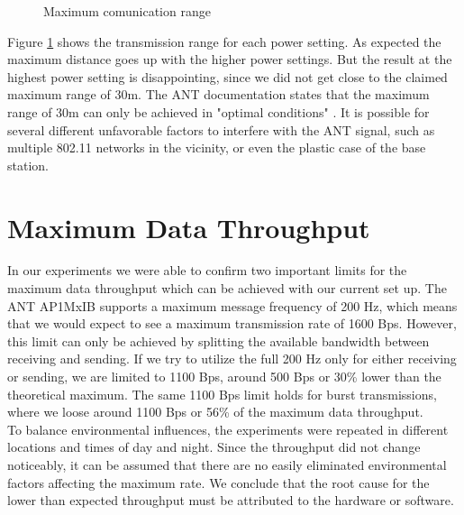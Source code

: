 \begin{description}
\begin{figure}[H]
		\caption{Maximum comunication range}\label{fig:exp6}
	\end{figure}
	Figure \ref{fig:exp6} shows the transmission range for each power setting. As expected the maximum distance goes up with the higher power settings. But the result at the highest power setting is disappointing, since we did not get close to the claimed maximum range of 30m. The ANT documentation states that the maximum range of 30m can only be achieved in "optimal conditions" \cite{DynastreamInnovationsInc.2013}. It is possible for several different unfavorable factors to interfere with the ANT signal, such as multiple 802.11 networks in the vicinity, or even the plastic case of the base station. 
\end{description}


\section{Maximum Data Throughput}
\label{sec:dataThrougput}

In our experiments we were able to confirm two important limits for the maximum data throughput which can be achieved with our current set up. The ANT AP1MxIB supports a maximum message frequency of 200 Hz, which means that we would expect to see a maximum transmission rate of 1600 Bps.
However, this limit can only be achieved by splitting the available bandwidth between receiving and sending. If we try to utilize the full 200 Hz only for either receiving or sending, we are limited to 1100 Bps, around 500 Bps or 30\% lower than the theoretical maximum. The same 1100 Bps limit holds for burst transmissions, where we loose around 1100 Bps or 56\% of the maximum data throughput.\\

To balance environmental influences, the experiments were repeated in different locations and times of day and night. Since the throughput did not change noticeably, it can be assumed that there are no easily eliminated environmental factors affecting the maximum rate. We conclude that the root cause for the lower than expected throughput must be attributed to the hardware or software. \\

